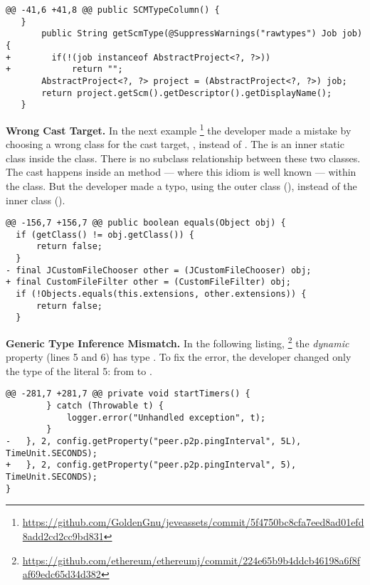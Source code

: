 \begin{lstlisting}[style=java]
@@ -41,6 +41,8 @@ public SCMTypeColumn() {
   }
       public String getScmType(@SuppressWarnings("rawtypes") Job job) {
+        if(!(job instanceof AbstractProject<?, ?>))
+            return "";
       AbstractProject<?, ?> project = (AbstractProject<?, ?>) job;
       return project.getScm().getDescriptor().getDisplayName();
   }
\end{lstlisting}

\textbf{Wrong Cast Target.}
In the next example%
\footnote{\url{https://github.com/GoldenGnu/jeveassets/commit/5f4750bc8cfa7eed8ad01efd8add2cd2cc9bd831}}
%
%
the developer made a mistake by choosing a wrong class for the cast target,
\ie,  instead of .
The  is an inner static class inside the  class.
There is no subclass relationship between these two classes.
The cast happens inside an  method
--- where this idiom is well known ---
within the  class.
But the developer made a typo, using the outer class (), instead of the inner class ().

\begin{lstlisting}[style=java]
@@ -156,7 +156,7 @@ public boolean equals(Object obj) {
  if (getClass() != obj.getClass()) {
      return false;
  }
- final JCustomFileChooser other = (JCustomFileChooser) obj;
+ final CustomFileFilter other = (CustomFileFilter) obj;
  if (!Objects.equals(this.extensions, other.extensions)) {
      return false;
  }
\end{lstlisting}

\textbf{Generic Type Inference Mismatch.}
In the following listing,%
\footnote{\url{https://github.com/ethereum/ethereumj/commit/224e65b9b4ddcb46198a6f8faf69edc65d34d382}}
the \emph{dynamic} property  (lines 5 and 6) has type .
To fix the error, the developer changed only the type of the
literal 5: from  to .

\begin{lstlisting}[style=java]
@@ -281,7 +281,7 @@ private void startTimers() {
        } catch (Throwable t) {
            logger.error("Unhandled exception", t);
        }
-   }, 2, config.getProperty("peer.p2p.pingInterval", 5L), TimeUnit.SECONDS);
+   }, 2, config.getProperty("peer.p2p.pingInterval", 5), TimeUnit.SECONDS);
}
\end{lstlisting}

